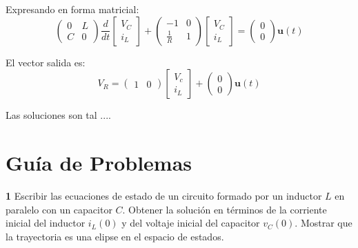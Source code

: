\documentclass[10pt,a4paper]{article} %
\begin{document}
	
	Expresando en forma matricial:
	\begin{equation}
		\begin{pmatrix}
		0&L\\
		C&0
		\end{pmatrix}\frac{d}{dt}\begin{bmatrix}
		V_C\\
		i_L
		\end{bmatrix}+\begin{pmatrix}
		-1 & 0\\
		\frac{1}{R}&1
		\end{pmatrix}\begin{bmatrix}
		V_C\\
		i_L
		\end{bmatrix}=\begin{pmatrix}
		0\\
		0
		\end{pmatrix}\textbf{u}(t)
	\end{equation}
	
	El vector salida es:
	\begin{equation}
	V_R=\begin{pmatrix}
	1&0
	\end{pmatrix}\begin{bmatrix}
	V_c\\
	i_L
	\end{bmatrix}+\begin{pmatrix}
	0\\
	0
	\end{pmatrix}\textbf{u}(t)
	\end{equation}
	
Las soluciones son tal .... 



	
	
	
	
	
	
	 
	\section{Guía de Problemas}
	\textbf{1} Escribir las ecuaciones de estado de un circuito formado por un inductor $L$ en paralelo con un capacitor $C$. Obtener la solución en términos de la corriente inicial del inductor $i_L(0)$ y del voltaje inicial del capacitor $v_C(0)$. Mostrar que la trayectoria es una elipse en el espacio de estados.\\
	
\end{document}

